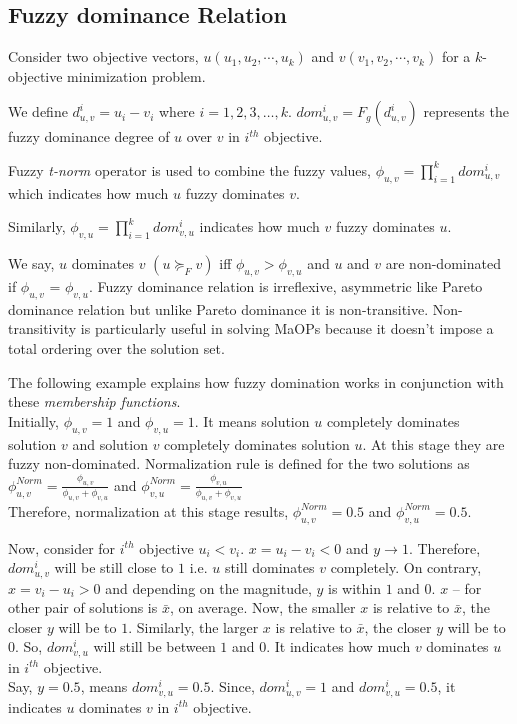 \documentclass[journal]{IEEEtran}
\begin{document}
\subsection{Fuzzy dominance Relation}

Consider two objective vectors, $u(u_1,u_2,\cdots,u_k)$ and $v(v_1,v_2,\cdots,v_k)$ for a $k$-objective minimization problem.

We define $d_{u,v}^{i}=u_i-v_i$ where $i=1,2,3,\dots,k$. $dom_{u,v}^{i}=F_g(d_{u,v}^{i})$ represents the fuzzy dominance degree of $u$ over $v$ in $i^{th}$ objective.

Fuzzy \textit{t-norm} operator is used to combine the fuzzy values, $\phi_{u,v}=\prod\limits_{i=1}^{k} dom_{u,v}^{i}$ which indicates how much $u$ fuzzy dominates $v$.

Similarly, $\phi_{v,u}=\prod\limits_{i=1}^{k} dom_{v,u}^{i}$ indicates how much $v$ fuzzy dominates $u$.

We say, $u$ dominates $v$ $(u \succeq_F v)$ iff $\phi_{u,v} > \phi_{v,u}$ and $u$ and $v$ are non-dominated if $\phi_{u,v}$ = $\phi_{v,u}$. Fuzzy dominance relation is irreflexive, asymmetric like Pareto dominance relation but unlike Pareto dominance it is non-transitive. Non-transitivity is particularly useful in solving MaOPs because it doesn't impose a total ordering over the solution set.

The following example explains how fuzzy domination works in conjunction with these \textit{membership functions}.\\
Initially, $\phi_{u,v}=1$ and $\phi_{v,u}=1$. It means solution $u$ completely dominates solution $v$ and solution $v$ completely dominates solution $u$. At this stage they are fuzzy non-dominated.
Normalization rule is defined for the two solutions as\\
$\phi_{u,v}^{Norm}=\frac{\phi_{u,v}}{\phi_{u,v}+\phi_{v,u}}$ and
$\phi_{v,u}^{Norm}=\frac{\phi_{v,u}}{\phi_{u,v}+\phi_{v,u}}$\\
Therefore, normalization at this stage results, $\phi_{u,v}^{Norm}=0.5$ and $\phi_{v,u}^{Norm}=0.5$.

Now, consider for $i^{th}$ objective $u_i<v_i$. $x=u_i-v_i <0$ and $y \rightarrow 1$. Therefore, $dom_{u,v}^{i}$ will be still close to $1$ i.e. $u$ still dominates $v$ completely.
On contrary, $x=v_i-u_i>0$ and depending on the magnitude, $y$ is within $1$ and $0$. $x$ – for other pair of solutions is $\bar{x}$, on average. Now, the smaller $x$ is relative to $\bar{x}$, the closer $y$ will be to $1$. Similarly, the larger $x$ is relative to $\bar{x}$, the closer $y$ will be to $0$. So, $dom_{v,u}^{i}$ will still be between $1$ and $0$. It indicates how much $v$ dominates $u$ in $i^{th}$ objective.\\
Say, $y = 0.5$, means $dom_{v,u}^{i}=0.5$. Since, $dom_{u,v}^{i}=1$ and $dom_{v,u}^{i}=0.5$, it indicates $u$ dominates $v$ in $i^{th}$ objective.
\end{document}
